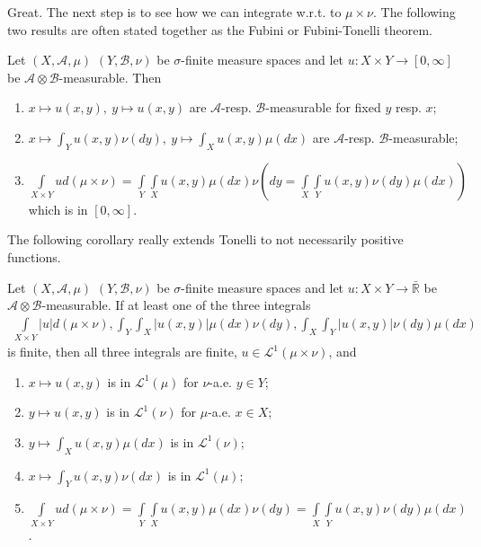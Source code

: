Great. The next step is to see how we can integrate w.r.t. to \(\mu\times\nu\). The following two results are often stated together as the Fubini or Fubini-Tonelli theorem. 

\begin{theorem}[Tonelli]    \label{theorem:Tonelli}
    Let \((X,\mathscr{A},\mu)\) \((Y,\mathscr{B},\nu)\) be \(\sigma\)-finite measure spaces and let \(u:X\times Y\rightarrow[0,\infty]\) be \(\mathscr{A}\otimes\mathscr{B}\)-measurable. Then
    \begin{enumerate}[label=(\roman*)]
        \item \(x\mapsto u(x,y), \ y\mapsto u(x,y)\) are \(\mathscr{A}\)-resp. \(\mathscr{B}\)-measurable for fixed \(y\) resp. \(x\);
        \item \(x\mapsto \int_Y u(x,y)\nu(dy), \ y\mapsto\int_X u(x,y) \mu(dx)\) are \(\mathscr{A}\)-resp. \(\mathscr{B}\)-measurable;
        \item \(\int\limits_{X\times Y}ud(\mu\times \nu) = \int\limits_Y\int\limits_X u(x,y)\mu(dx)\nu(dy = \int\limits_X\int\limits_Yu(x,y)\nu(dy)\mu(dx))\) which is in \([0,\infty]\).
    \end{enumerate}
\end{theorem}
The following corollary really extends Tonelli to not necessarily positive functions.
\begin{corollary} \label{corollary:fubini_theorem}
    Let \((X,\mathscr{A},\mu)\) \((Y,\mathscr{B},\nu)\) be \(\sigma\)-finite measure spaces and let \(u:X\times Y\rightarrow\bar{\mathbb{R}}\) be \(\mathscr{A}\otimes\mathscr{B}\)-measurable. If at least one of the three integrals
    \begin{align*}
        \int\limits_{X\times Y}|u|d(\mu\times\nu), \int_Y\int_X |u(x,y)|\mu(dx)\nu(dy), \int_X\int_Y |u(x,y)|\nu(dy)\mu(dx)
    \end{align*}
    is finite, then all three integrals are finite, \(u\in\mathcal{L}^1(\mu\times\nu)\), and
    \begin{enumerate}[label=(\roman*)]
        \item \(x\mapsto u(x,y)\) is in \(\mathcal{L}^1(\mu)\) for \(\nu\)-a.e. \(y\in Y\);
        \item \(y\mapsto u(x,y)\) is in \(\mathcal{L}^1(\nu)\) for \(\mu\)-a.e. \(x\in X\);
        \item \(y\mapsto\int_Xu(x,y)\mu(dx)\) is in \(\mathcal{L}^1(\nu)\);
        \item \(x\mapsto\int_Yu(x,y)\nu(dx)\) is in \(\mathcal{L}^1(\mu)\);
        \item \(\int\limits_{X\times Y}ud(\mu\times\nu)=\int\limits_Y\int\limits_X u(x,y)\mu(dx)\nu(dy)=\int\limits_X\int\limits_Y u(x,y)\nu(dy)\mu(dx)\).
    \end{enumerate}
\end{corollary}